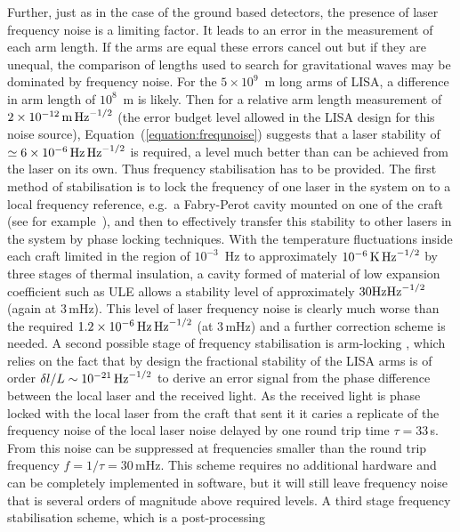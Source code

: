 \documentclass{article}
\begin{document}
Further, just as in the case of the ground based detectors, the presence of
laser frequency noise is a limiting factor. It leads to an error in the
measurement of each arm length. If the arms are equal these errors cancel out
but if they are unequal, the comparison of lengths used to search for
gravitational waves may be dominated by frequency noise. For the
$5\times10^9$~m long arms of LISA, a difference in arm length of $10^8$~m is 
likely. Then for a relative arm length measurement of $2 \times 10^{-12}\,{\rm
m}\,{\rm Hz}^{-1/2}$ (the error budget level allowed in the LISA design for this
noise source), Equation~(\ref{equation:frequnoise}) suggests that a laser
stability of $\simeq 6 \times 10^{-6}\,{\rm Hz}\,{\rm Hz}^{-1/2}$ is required, a
level much better than can be achieved from the laser on its own. Thus frequency
stabilisation has to be provided. The first method of stabilisation is to lock
the frequency of one laser in the system on to a local frequency reference, 
e.g.\ a Fabry-Perot cavity mounted on one of the craft (see for
example~\cite{McNamara}), and then to effectively transfer this stability to
other lasers in the system by phase locking techniques. With the temperature
fluctuations inside each craft limited in the region of $10^{-3}$~Hz to
approximately $10^{-6}\,{\rm K}\,{\rm Hz}^{-1/2}$ by three stages of thermal
insulation, a cavity formed of material of low expansion coefficient such as ULE
allows a stability level of approximately $30 {\rm Hz}{\rm Hz}^{-1/2}$ (again
at 3\,mHz). This level of laser frequency noise is clearly much worse than the
required $1.2 \times 10^{-6}\,{\rm Hz}\,{\rm Hz}^{-1/2}$ (at 3\,mHz) and a
further correction scheme is needed. A second possible stage of frequency
stabilisation is arm-locking \cite{Sheard:2003}, which relies on the fact that
by design the fractional stability of the LISA arms is of order $\delta{}l/L
\sim 10^{-21}\,{\rm Hz}^{-1/2}$ to derive an error signal from the phase 
difference between the local laser and the received light. As the received light
is phase locked with the local laser from the craft that sent it it caries a
replicate of the frequency noise of the local laser noise delayed by one round
trip time $\tau=33$\,s. From this noise can be suppressed at frequencies smaller
than the round trip frequency $f= 1/\tau = 30$\,mHz. This scheme requires no
additional hardware and can be completely implemented in software, but it will
still leave frequency noise that is several orders of magnitude above required
levels. A third stage frequency stabilisation scheme, which is a post-processing
\end{document}
